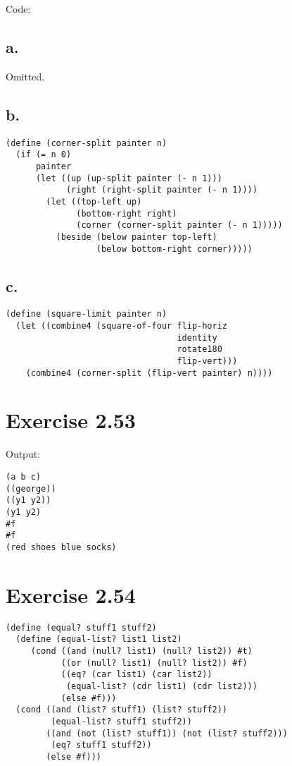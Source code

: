 \documentclass[../main.tex]{subfiles}
\begin{document}
Code:

\subsection{a.}

Omitted.

\subsection{b.}

\begin{lstlisting}
(define (corner-split painter n)
  (if (= n 0)
      painter
      (let ((up (up-split painter (- n 1)))
            (right (right-split painter (- n 1))))
        (let ((top-left up)
              (bottom-right right)
              (corner (corner-split painter (- n 1)))))
          (beside (below painter top-left)
                  (below bottom-right corner)))))
\end{lstlisting}

\subsection{c.}

\begin{lstlisting}
(define (square-limit painter n)
  (let ((combine4 (square-of-four flip-horiz
                                  identity
                                  rotate180
                                  flip-vert)))
    (combine4 (corner-split (flip-vert painter) n))))
\end{lstlisting}

\section{Exercise 2.53}

Output:

\begin{lstlisting}
(a b c)
((george))
((y1 y2))
(y1 y2)
#f
#f
(red shoes blue socks)
\end{lstlisting}

\section{Exercise 2.54}

\begin{lstlisting}
(define (equal? stuff1 stuff2)
  (define (equal-list? list1 list2)
     (cond ((and (null? list1) (null? list2)) #t)
           ((or (null? list1) (null? list2)) #f)
           ((eq? (car list1) (car list2))
            (equal-list? (cdr list1) (cdr list2)))
           (else #f)))
  (cond ((and (list? stuff1) (list? stuff2))
         (equal-list? stuff1 stuff2))
        ((and (not (list? stuff1)) (not (list? stuff2)))
         (eq? stuff1 stuff2))
        (else #f)))
\end{lstlisting}
\end{document}
